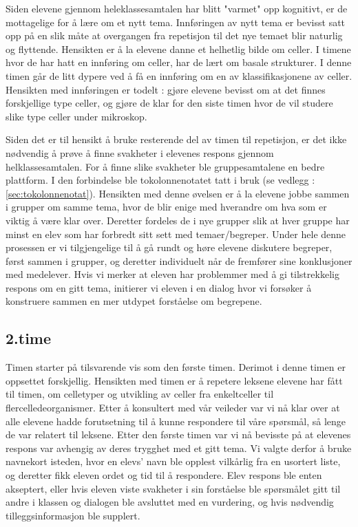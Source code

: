 \documentclass[main.tex]{subfiles}
\begin{document}
Siden elevene gjennom heleklassesamtalen har blitt "varmet" opp kognitivt, er de mottagelige for å 
lære om et nytt tema. Innføringen av nytt tema er bevisst satt opp på en slik måte at overgangen 
fra repetisjon til det nye temaet blir naturlig og flyttende. Hensikten er å la elevene danne et 
helhetlig bilde om celler. I timene hvor de har hatt en innføring om celler, har de lært om basale 
strukturer. I denne timen går de litt dypere ved å få en innføring om en av klassifikasjonene av celler.
Hensikten med innføringen er todelt : gjøre elevene bevisst om at det finnes forskjellige type
celler, og gjøre de klar for den siste timen hvor de vil studere slike type celler under mikroskop.

Siden det er til hensikt å bruke resterende del av timen til repetisjon, er det ikke nødvendig å 
prøve å finne svakheter i elevenes respons gjennom helklassesamtalen. For å finne slike svakheter 
ble gruppesamtalene en bedre plattform. I den forbindelse ble tokolonnenotatet tatt i bruk (se 
vedlegg : \ref{sec:tokolonnenotat}). Hensikten med denne øvelsen er å la elevene jobbe sammen
i grupper om samme tema, hvor de blir enige med hverandre om hva som er viktig å være klar over. 
Deretter fordeles de i nye grupper slik at hver gruppe har minst en elev som har forbredt sitt sett 
med temaer/begreper. Under hele denne prosessen er vi tilgjengelige til å gå rundt og høre elevene 
diskutere begreper, først sammen i grupper, og deretter individuelt når de fremfører sine 
konklusjoner med medelever. Hvis vi merker at eleven har problemmer med å gi tilstrekkelig 
respons om en gitt tema, initierer vi eleven i en dialog hvor vi forsøker å konstruere sammen en 
mer utdypet forståelse om begrepene. 

\subsection*{2.time}

Timen starter på tilsvarende vis som den første timen. Derimot i denne timen er oppsettet 
forskjellig. Hensikten med timen er å repetere leksene elevene har fått til timen, om celletyper og
utvikling av celler fra enkeltceller til flercelledeorganismer. Etter å konsultert med vår veileder 
var vi nå klar over at alle elevene hadde forutsetning til å kunne respondere til våre spørsmål, 
så lenge de var relatert til leksene. Etter den første timen var vi nå bevisste på at elevenes 
respons var avhengig av deres trygghet med et gitt tema. Vi valgte derfor å bruke navnekort 
isteden, hvor en elevs' navn ble opplest vilkårlig fra en usortert liste, og deretter fikk eleven 
ordet og tid til å respondere. Elev respons ble enten akseptert, eller hvis eleven viste svakheter
i sin forståelse ble spørsmålet gitt til andre i klassen og dialogen ble avsluttet med en vurdering,
og hvis nødvendig tilleggsinformasjon ble supplert. 
\end{document}
